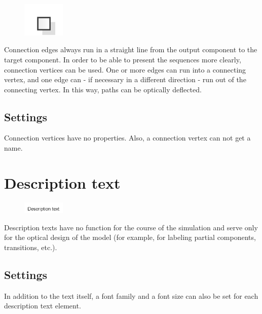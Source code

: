 \begin{figure}
\vspace{-22pt}
\includegraphics[width=2cm]{imageModelElementVertex.png}
\vspace{-22pt}
\end{figure}

Connection edges always run in a straight line from the output component
to the target component. In order to be able to present the sequences more clearly, connection vertices can be used.
One or more edges can run into a connecting vertex, and one edge can - if necessary in a different direction - run out
of the connecting vertex. In this way, paths can be optically deflected.

\subsection*{Settings}

Connection vertices have no properties. Also, a connection vertex can not get a name.


\section{Description text}
\label{ref:ModelElementText}

\begin{figure}
\vspace{-22pt}
\includegraphics[width=2cm]{imageModelElementText.png}
\vspace{-22pt}
\end{figure}

Description texts have no function for the course of the simulation
and serve only for the optical design of the model
(for example, for labeling partial components, transitions, etc.).

\subsection*{Settings}

In addition to the text itself, a font family and a font size can also be set for each description text element.

